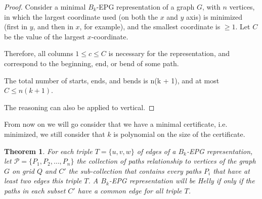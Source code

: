 \documentclass[a4paper,11pt]{article}
\newtheorem{theorem}{Theorem}
\begin{document}
\begin{proof}
Consider a minimal $B_k$-EPG representation of a graph $G$, with $n$ vertices, in which the largest coordinate used (on both the $x$ and $y$ axis) is minimized (first in $y$, and then in $x$, for example), and the smallest coordinate is $\geq 1$. Let $C$ be the value of the largest $x$-coordinate.

 Therefore, all columns $1 \leq c \leq C$ is necessary for the representation, and correspond to the beginning, end, or bend of some path.

The total number of starts, ends, and bends is n(k + 1), and at most $C \leq n(k + 1)$.

The reasoning can also be applied to vertical.
\end{proof}

From now on we will go consider that we have a minimal certificate, i.e. minimized, we still consider that $k$ is polynomial on the size of the certificate. 

\begin{theorem}
For each triple $T=\{u,v,w\}$ of edges of a $B_k$-EPG representation, let $\mathcal{P}=\{P_1, P_2, \dots, P_n\}$ the collection of paths relationship to vertices of the graph $G$ on grid $Q$ and $C'$ the sub-collection that contains every paths $P_i$ that have at least two edges this triple $T$. A $B_k$-EPG representation will be Helly if only if the paths in each subset $C'$ have a common edge for all triple $T$. 
\end{theorem}
\end{document}
